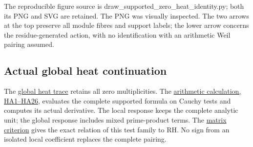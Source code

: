 \documentclass[
  10pt,
  a4paper,
]{article}
\begin{document}
The reproducible figure source is
draw\_supported\_zero\_heat\_identity.py; both its PNG and SVG are
retained. The PNG was visually inspected. The two arrows at the top
preserve all module fibres and support labels; the lower arrow concerns
the residue-generated action, with no identification with an arithmetic
Weil pairing assumed.

\subsection{Actual global heat
continuation}\label{actual-global-heat-continuation}

The \href{ACTUAL_HEAT_ZERO_DISTRIBUTION_VARIATION.md}{global heat trace}
retains all zero multiplicities. The
\href{HEAT_CAUCHY_ARITHMETIC_DERIVATION.md}{arithmetic calculation,
HA1--HA26}, evaluates the complete supported formula on Cauchy tests and
computes its actual derivative. The local response keeps the complete
analytic unit; the global response includes mixed prime-product terms.
The \href{CAUCHY_WEIL_POSITIVITY_CRITERION.md}{matrix criterion} gives
the exact relation of this test family to RH. No sign from an isolated
local coefficient replaces the complete pairing.
\end{document}
